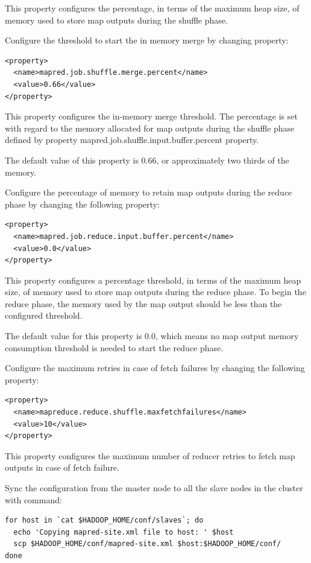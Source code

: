 This property configures the percentage, in terms of the maximum heap size, of memory used to store map outputs during the shuffle phase.


Configure the threshold to start the in memory merge by changing property:
\lstset{style=bashstyle}
\begin{lstlisting}
<property>
  <name>mapred.job.shuffle.merge.percent</name>
  <value>0.66</value>
</property>
\end{lstlisting}

This property configures the in-memory merge threshold. The percentage is set with regard to the memory allocated for map outputs during the shuffle phase defined by property mapred.job.shuffle.input.buffer.percent property.

The default value of this property is 0.66, or approximately two thirds of the memory.

Configure the percentage of memory to retain map outputs during the reduce phase by changing the following property:
\lstset{style=bashstyle}
\begin{lstlisting}
<property>
  <name>mapred.job.reduce.input.buffer.percent</name>
  <value>0.0</value>
</property>
\end{lstlisting}
This property configures a percentage threshold, in terms of the maximum heap size, of memory used to store map outputs during the reduce phase. To begin the reduce phase, the memory used by the map output should be less than the configured threshold.

The default value for this property is 0.0, which means no map output memory consumption threshold is needed to start the reduce phase.

Configure the maximum retries in case of fetch failures by changing the following property:
\lstset{style=bashstyle}
\begin{lstlisting}
<property>
  <name>mapreduce.reduce.shuffle.maxfetchfailures</name>
  <value>10</value>
</property>
\end{lstlisting}

This property configures the maximum number of reducer retries to fetch map outputs in case of fetch failure.


Sync the configuration from the master node to all the slave nodes in the cluster with command:
\lstset{style=bashstyle}
\begin{lstlisting}
for host in `cat $HADOOP_HOME/conf/slaves`; do
  echo 'Copying mapred-site.xml file to host: ' $host
  scp $HADOOP_HOME/conf/mapred-site.xml $host:$HADOOP_HOME/conf/
done
\end{lstlisting}


